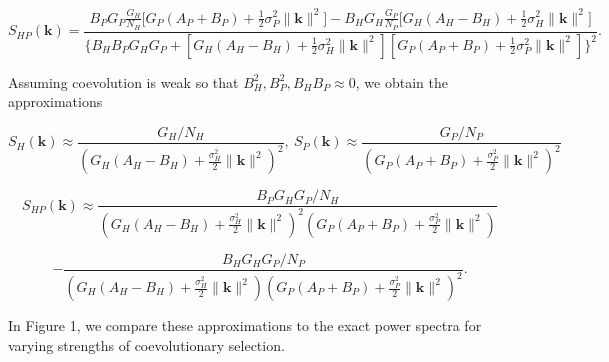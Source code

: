 \documentclass{article}
\begin{document}
\[S_{HP}(\pmb k)=\frac{B_PG_P\frac{G_H}{N_H}\big[G_P(A_P+B_P)+\frac{1}{2}\sigma_P^2\|\pmb k\|^2\big]-B_HG_H\frac{G_P}{N_P}\big[G_H(A_H-B_H)+\frac{1}{2}\sigma_H^2\|\pmb k\|^2\big]}{\big\{B_HB_PG_HG_P+[G_H(A_H-B_H)+\frac{1}{2}\sigma_H^2\|\pmb k\|^2][G_P(A_P+B_P)+\frac{1}{2}\sigma_P^2\|\pmb k\|^2]\big\}^2}.\]

Assuming coevolution is weak so that \(B_H^2,B_P^2,B_HB_P\approx0\), we
obtain the approximations

\[S_H(\pmb k)\approx\frac{G_H/N_H}{\left(G_H(A_H-B_H)+\frac{\sigma_H^2}{2}\|\pmb k\|^2\right)^2}, \ S_P(\pmb k)\approx\frac{G_P/N_P}{\left(G_P(A_P+B_P)+\frac{\sigma_P^2}{2}\|\pmb k\|^2\right)^2}\]

\[S_{HP}(\pmb k)\approx\frac{B_PG_HG_P/N_H}{\left(G_H(A_H-B_H)+\frac{\sigma_H^2}{2}\|\pmb k\|^2\right)^2\left(G_P(A_P+B_P)+\frac{\sigma_P^2}{2}\|\pmb k\|^2\right)}\]

\[-\frac{B_HG_HG_P/N_P}{\left(G_H(A_H-B_H)+\frac{\sigma_H^2}{2}\|\pmb k\|^2\right)\left(G_P(A_P+B_P)+\frac{\sigma_P^2}{2}\|\pmb k\|^2\right)^2}.\]

In Figure 1, we compare these approximations to the exact power spectra
for varying strengths of coevolutionary selection.
\end{document}
